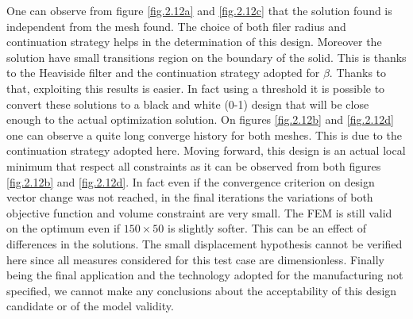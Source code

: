      One can observe from figure \ref{fig.2.12a} and \ref{fig.2.12c} that the solution found is independent from the mesh found. The choice of both filer radius and continuation strategy helps in the determination of this design. Moreover the solution have small transitions region on the boundary of the solid. This is thanks to the Heaviside filter and the continuation strategy adopted for $\beta$. Thanks to that, exploiting this results is easier. In fact using a threshold it is possible to convert these solutions to a black and white (0-1) design that will be close enough to the actual optimization solution.  On figures \ref{fig.2.12b} and \ref{fig.2.12d} one can observe a quite long converge history for both meshes. This is due to the continuation strategy adopted here. Moving forward, this design is an actual local minimum that respect all constraints as it can be observed from both figures \ref{fig.2.12b} and \ref{fig.2.12d}. In fact even if the convergence criterion on design vector change was not reached, in the final iterations the variations of both objective function and volume constraint are very small. The FEM is still valid on the optimum even if $150\times50$ is slightly softer. This can be an effect of differences in the solutions.
      The small displacement hypothesis cannot be verified here since all measures considered for this test case are dimensionless. Finally being the final application and the technology adopted for the manufacturing not specified, we cannot make any conclusions about the acceptability of this design candidate or of the model validity.
     \clearpage
